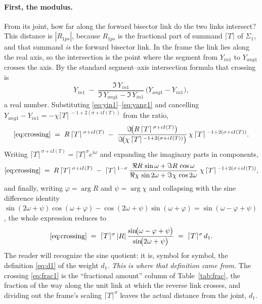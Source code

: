\documentclass[11pt]{article}
\theoremstyle{definition}
\begin{document}
\paragraph{First, the modulus.} From its joint, how far along the forward
bisector link do the two links intersect? This distance is $|R_{1ps}|$,
because $R_{1ps}$ is the fractional part of summand $\lceil T\rceil$ of
$\Sigma_1$, and that summand \emph{is} the forward bisector link. In the
frame the link lies along the real axis, so the intersection is the point
where the segment from $Y_{in1}$ to $Y_{ang1}$ crosses the axis. By the
standard segment--axis intersection formula that crossing is
\begin{equation}\label{eq:crossing}
Y_{in1}
\;-\;
\frac{\Im\,Y_{in1}}
     {\Im\,Y_{ang1}-\Im\,Y_{in1}}\,
\bigl(Y_{ang1}-Y_{in1}\bigr),
\end{equation}
a real number. Substituting \eqref{eq:yin1}--\eqref{eq:yang1} and cancelling
$Y_{ang1}-Y_{in1}=-\chi\lceil T\rceil^{\,-1+2(\sigma+iI(T))}$ from the ratio,
\begin{equation}\label{eq:yang3lin}
\eqref{eq:crossing}
\;=\;
R\,\lceil T\rceil^{\,\sigma+iI(T)}
\;-\;
\frac{\Im\!\bigl(R\,\lceil T\rceil^{\,\sigma+iI(T)}\bigr)}
     {\Im\!\bigl(\chi\,\lceil T\rceil^{\,-1+2(\sigma+iI(T))}\bigr)}\,
\chi\,\lceil T\rceil^{\,-1+2(\sigma+iI(T))}.
\end{equation}
Writing $\lceil T\rceil^{\,\sigma+iI(T)}=\lceil T\rceil^{\sigma}e^{i\omega}$
and expanding the imaginary parts in components,
\begin{equation}\label{eq:compact5}
\eqref{eq:crossing}
\;=\;
R\,\lceil T\rceil^{\,\sigma+iI(T)}
\;-\;
\lceil T\rceil^{\,1-\sigma}\,
\frac{\Re R\,\sin\omega+\Im R\,\cos\omega}
     {\Re\chi\,\sin 2\omega+\Im\chi\,\cos 2\omega}\;
\chi\,\lceil T\rceil^{\,-1+2(\sigma+iI(T))},
\end{equation}
and finally, writing $\varphi=\arg R$ and $\psi=\arg\chi$ and collapsing with
the sine difference identity
$\sin(2\omega+\psi)\cos(\omega+\varphi)-\cos(2\omega+\psi)\sin(\omega+\varphi)
=\sin(\omega-\varphi+\psi)$, the whole expression reduces to
\begin{equation}\label{eq:frac1}
\eqref{eq:crossing}
\;=\;
\lceil T\rceil^{\sigma}\,|R|\,
\frac{\sin\!\bigl(\omega-\varphi+\psi\bigr)}{\sin\!\bigl(2\omega+\psi\bigr)}
\;=\; \lceil T\rceil^{\sigma}\, d_1 .
\end{equation}
The reader will recognize the sine quotient: it is, symbol for symbol, the
definition \eqref{eq:d1} of the weight $d_1$. \emph{This is where that
definition came from.} The crossing \eqref{eq:frac1} is the ``fractional
amount'' column of Table~\ref{tab:frac}, the fraction of the way along the
unit link at which the reverse link crosses, and dividing out the frame's
scaling $\lceil T\rceil^{\sigma}$ leaves the actual distance from the joint,
$d_1$.
\end{document}
